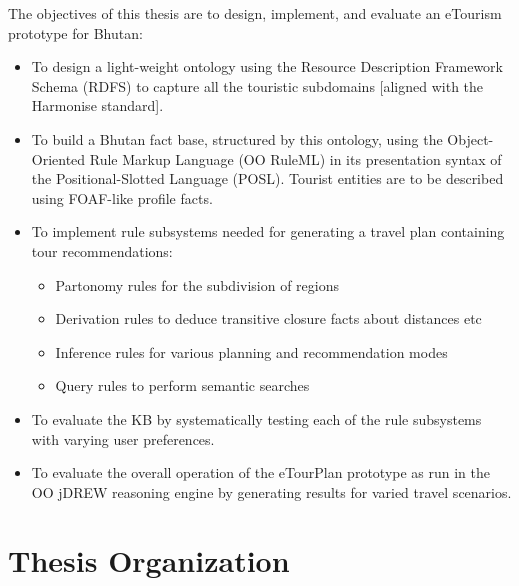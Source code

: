The objectives of this thesis are to design, implement, and evaluate an eTourism prototype for Bhutan:
\begin{itemize}
\item To design a light-weight ontology using the Resource Description Framework Schema (RDFS) to capture all the touristic subdomains [aligned with the Harmonise standard].

\item To build a Bhutan fact base, structured by this ontology, using the Object-Oriented Rule Markup Language (OO RuleML) in its presentation syntax of the Positional-Slotted Language (POSL). Tourist entities are to be described using FOAF-like profile facts.

\item To implement rule subsystems needed for generating a travel plan containing tour recommendations:
\begin{itemize}
\item Partonomy rules for the subdivision of regions
\item Derivation rules to deduce transitive closure facts about distances etc
\item Inference rules for various planning and recommendation modes
\item Query rules to perform semantic searches
\end{itemize}

\item To evaluate the KB by systematically testing each of the rule subsystems with varying user preferences.

\item To evaluate the overall operation of the eTourPlan prototype as run in the OO jDREW reasoning engine by generating results for varied travel scenarios.

\end{itemize}


\section{Thesis Organization}

